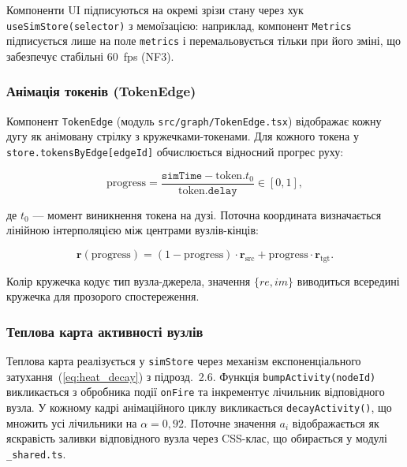 Компоненти UI підписуються на окремі зрізи стану через хук
\texttt{useSimStore(selector)} з мемоїзацією: наприклад, компонент
\texttt{Metrics} підписується лише на поле \texttt{metrics} і
перемальовується тільки при його зміні, що забезпечує стабільні
60~fps (NF3).

\subsubsection*{Анімація токенів (TokenEdge)}

Компонент \texttt{TokenEdge} (модуль \texttt{src/graph/\allowbreak TokenEdge.tsx})
відображає кожну дугу як анімовану стрілку з кружечками-токенами.
Для кожного токена у \texttt{store.tokensByEdge[edgeId]} обчислюється
відносний прогрес руху:

\begin{equation}
  \mathrm{progress} = \frac{\texttt{simTime} - \mathrm{token}.t_0}
                           {\mathrm{token}.\texttt{delay}}
                    \in [0, 1],
  \label{eq:progress}
\end{equation}

де $t_0$ --- момент виникнення токена на дузі. Поточна координата
визначається лінійною інтерполяцією між центрами вузлів-кінців:

\begin{equation}
  \mathbf{r}(\mathrm{progress}) =
    (1 - \mathrm{progress}) \cdot \mathbf{r}_{\text{src}}
    + \mathrm{progress} \cdot \mathbf{r}_{\text{tgt}}.
  \label{eq:lerp}
\end{equation}

Колір кружечка кодує тип вузла-джерела, значення $\{re, im\}$
виводиться всередині кружечка для прозорого спостереження.

\subsubsection*{Теплова карта активності вузлів}

Теплова карта реалізується у \texttt{simStore} через механізм
експоненціального затухання~(\ref{eq:heat_decay}) з підрозд.~2.6.
Функція \texttt{bumpActivity(nodeId)} викликається з обробника
події \texttt{onFire} та інкрементує лічильник відповідного вузла.
У кожному кадрі анімаційного циклу викликається
\texttt{decayActivity()}, що множить усі лічильники на
$\alpha = 0{,}92$. Поточне значення $a_i$ відображається як
яскравість заливки відповідного вузла через CSS-клас, що
обирається у модулі \texttt{\_shared.ts}.

